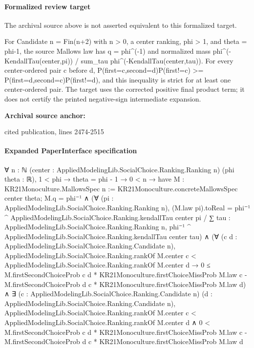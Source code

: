 \documentclass[10pt]{article}
\begin{document}
\paragraph{Formalized review target}
The archival source above is not asserted equivalent to this formalized target.
\begin{ReviewVerbatim}
For Candidate n = Fin(n+2) with n > 0, a center ranking, phi > 1, and theta = phi-1, the source Mallows law has q = phi^(-1) and normalized mass phi^(-KendallTau(center,pi)) / sum_tau phi^(-KendallTau(center,tau)). For every center-ordered pair c before d, P(first=c,second=d)P(first!=c) >= P(first=d,second=c)P(first!=d), and this inequality is strict for at least one center-ordered pair. The target uses the corrected positive final product term; it does not certify the printed negative-sign intermediate expansion.
\end{ReviewVerbatim}

\textbf{Archival source anchor:} {\footnotesize\raggedright cited publication, lines 2474-\allowbreak{}2515\par}
\paragraph{Expanded PaperInterface specification}
\begin{ReviewVerbatim}
∀ {n : ℕ} (center : AppliedModelingLib.SocialChoice.Ranking.Ranking n) (phi theta : ℝ),
  1 < phi →
    theta = phi - 1 →
      0 < n →
        have M : KR21Monoculture.MallowsSpec n := KR21Monoculture.concreteMallowsSpec center theta;
        M.q = phi⁻¹ ∧
          (∀ (pi : AppliedModelingLib.SocialChoice.Ranking.Ranking n),
              (M.law pi).toReal =
                phi⁻¹ ^ AppliedModelingLib.SocialChoice.Ranking.kendallTau center pi /
                  ∑ tau : AppliedModelingLib.SocialChoice.Ranking.Ranking n,
                    phi⁻¹ ^ AppliedModelingLib.SocialChoice.Ranking.kendallTau center tau) ∧
            (∀ (c d : AppliedModelingLib.SocialChoice.Ranking.Candidate n),
                AppliedModelingLib.SocialChoice.Ranking.rankOf M.center c <
                    AppliedModelingLib.SocialChoice.Ranking.rankOf M.center d →
                  0 ≤
                    M.firstSecondChoiceProb c d * KR21Monoculture.firstChoiceMissProb M.law c -
                      M.firstSecondChoiceProb d c * KR21Monoculture.firstChoiceMissProb M.law d) ∧
              ∃ (c : AppliedModelingLib.SocialChoice.Ranking.Candidate n) (d :
                AppliedModelingLib.SocialChoice.Ranking.Candidate n),
                AppliedModelingLib.SocialChoice.Ranking.rankOf M.center c <
                    AppliedModelingLib.SocialChoice.Ranking.rankOf M.center d ∧
                  0 <
                    M.firstSecondChoiceProb c d * KR21Monoculture.firstChoiceMissProb M.law c -
                      M.firstSecondChoiceProb d c * KR21Monoculture.firstChoiceMissProb M.law d
\end{ReviewVerbatim}
\end{document}

